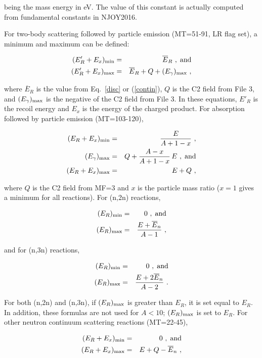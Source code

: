\noindent
being the mass energy in eV.  The value of this constant is
actually computed from fundamental constants in NJOY2016.

For two-body scattering followed by particle emission
(MT=51-91, LR flag set), a minimum and maximum can be defined:

\begin{eqnarray}
   (E'_R+E_x)_{\rm min}&=&\overline{E}_R\,\,,\;\hbox{and}\\
   (E'_R+E_x)_{\rm max}&=&\overline{E}_R+Q+(E_\gamma)_{\rm max}\,\,,
\end{eqnarray}

\noindent
where $\overline{E}_R$ is the value from Eq.~\ref{disc} or
(\ref{contin}), $Q$ is the C2 field from File 3, and
$(E_\gamma)_{\rm max}$ is the negative of the C2 field from
File 3.  In these equations, $E'_R$ is the recoil energy
and $E_x$ is the energy of the charged product.  For
absorption followed by particle emission (MT=103-120),

\begin{eqnarray}
   (E_R+E_x)_{\rm min}&=&\frac{E}{A+1-x}\,\,,\\
   (E_\gamma)_{\rm max}&=&Q+\frac{A-x}{A+1-x}\,E\,\,,\;\hbox{and}\\
   (E_R+E_x)_{\rm max}&=&E+Q\,\,,
\end{eqnarray}

\noindent
where $Q$ is the C2 field from MF=3 and $x$ is the particle mass
ratio ($x{=}1$ gives a minimum for all reactions).
For (n,2n) reactions,

\begin{eqnarray}
   (E_R)_{\rm min}&=&0\,\,,\;\hbox{and}\\
   (E_R)_{\rm max}&=&\frac{E+\overline{E}_n}{A-1}\,\,,
\end{eqnarray}

\noindent
and for (n,3n) reactions,

\begin{eqnarray}
   (E_R)_{\rm min}&=&0\,\,,\;\hbox{and}\\
   (E_R)_{\rm max}&=&\frac{E+2\overline{E}_n}{A-2}\,\,.
\end{eqnarray}

\noindent
For both (n,2n) and (n,3n), if $(E_R)_{\rm max}$ is greater than
$E_R$, it is set equal to $E_R$.  In addition, these formulas
are not used for $A{<}10$; $(E_R)_{\rm max}$ is set to $E_R$.
For other neutron continuum scattering reactions (MT=22-45),

\begin{eqnarray}
   (E_R+E_x)_{\rm min}&=&0\,\,,\;\hbox{and}\\
   (E_R+E_x)_{\rm max}&=&E+Q-\overline{E}_n\,\,,
\end{eqnarray}

